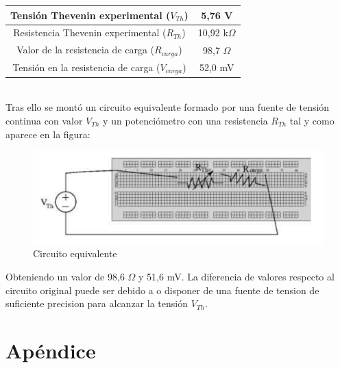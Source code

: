 \documentclass[a4paper,11pt]{article}
\begin{document}
\begin{tabular}{|c|c|}
\hline
Tensión Thevenin experimental ($V_{Th}$) & 5,76 V\\
\hline
Resistencia Thevenin experimental ($R_{Th}$) & 10,92 k$\Omega$ \\
\hline
Valor de la resistencia de carga ($R_{carga}$) & 98,7 $\Omega$ \\
\hline
Tensión en la resistencia de carga ($V_{carga}$)	& 52,0 mV \\
\hline
\end{tabular}\\

Tras ello se montó un circuito equivalente formado por una fuente de tensión continua con valor $V_{Th}$ y un potenciómetro con una resistencia $R_{Th}$ tal y como aparece en la figura:

\begin{figure}[hbtp]
\centering
\includegraphics[scale=0.5]{Imagenes/circuito.png}
\caption{Circuito equivalente}
\end{figure}
Obteniendo un valor de 98,6 $\Omega$ y 51,6 mV. La diferencia de valores respecto al circuito original puede ser debido a o disponer de una fuente de tension de suficiente precision para alcanzar la tensión $V_{Th}$.

\newpage

 

\nocite{Quintero2018}
\nocite{Zetina2000}

\section{Apéndice}
\end{document}

